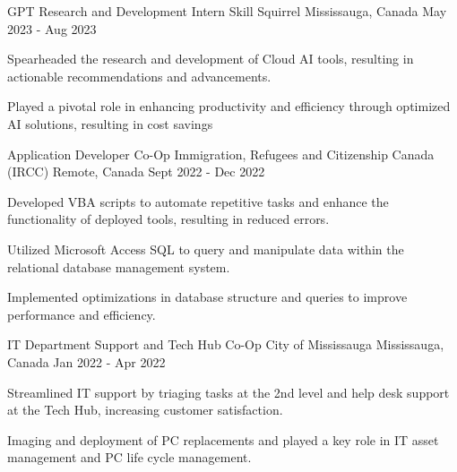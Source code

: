 \begin{cventries}
 \cventry
    {GPT Research and Development Intern}
    {Skill Squirrel}
    {Mississauga, Canada}
    {May 2023 - Aug 2023}
    {
      \begin{cvitems}
        \item {Spearheaded the research and development of Cloud AI tools, resulting in actionable recommendations and advancements.}
        \item {Played a pivotal role in enhancing productivity and efficiency through optimized AI solutions, resulting in cost savings}
      \end{cvitems}
    }
  \cventry
    {Application Developer Co-Op}
    {Immigration, Refugees and Citizenship Canada (IRCC)}
    {Remote, Canada}
    {Sept 2022 - Dec 2022}
    {
      \begin{cvitems}
        \item {Developed VBA scripts to automate repetitive tasks and enhance the functionality of deployed tools, resulting in reduced errors.}
        \item {Utilized Microsoft Access SQL to query and manipulate data within the relational database management system.}
		\item {Implemented optimizations in database structure and queries to improve performance and efficiency.}
      \end{cvitems}
    }
      \cventry
    {IT Department Support and Tech Hub Co-Op}
    {City of Mississauga}
    {Mississauga, Canada}
    {Jan 2022 - Apr 2022}
    {
      \begin{cvitems}
        \item {Streamlined IT support by triaging tasks at the 2nd level and help desk support at the Tech Hub, increasing customer satisfaction.}
        \item {Imaging and deployment of PC replacements and played a key role in IT asset management and PC life cycle management.}
      \end{cvitems}
    }

\end{cventries}
